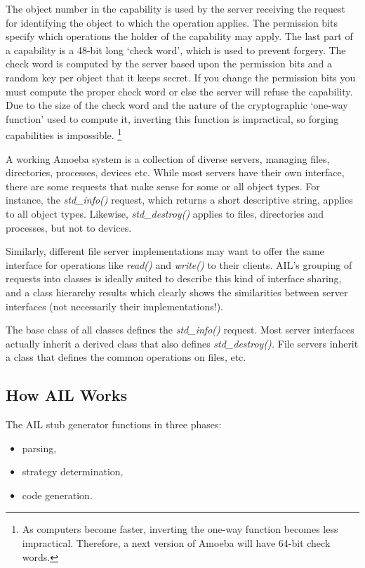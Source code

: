The object number in the capability is used by the server receiving
the request for identifying the object to which the operation applies.
The permission bits specify which operations the holder of the capability
may apply.  The last part of a capability is a 48-bit long `check
word', which is used to prevent forgery.  The check word is computed
by the server based upon the permission bits and a random key per object
that it keeps secret.  If you change the permission bits you must compute
the proper check word or else the server will refuse the capability.
Due to the size of the check word and the nature of the cryptographic
`one-way function' used to compute it, inverting this function is
impractical, so forging capabilities is impossible.%
\footnote{
As computers become faster, inverting the one-way function becomes
less impractical.
Therefore, a next version of Amoeba will have 64-bit check words.
}

A working Amoeba system is a collection of diverse servers, managing
files, directories, processes, devices etc.  While most servers have
their own interface, there are some requests that make sense for some
or all object types.  For instance, the {\em std\_info()} request,
which returns a short descriptive string, applies to all object types.
Likewise, {\em std\_destroy()} applies to files, directories and
processes, but not to devices.

Similarly, different file server implementations may want to offer the
same interface for operations like {\em read()} and {\em write()} to
their clients.  AIL's grouping of requests into classes is ideally
suited to describe this kind of interface sharing, and a class
hierarchy results which clearly shows the similarities between server
interfaces (not necessarily their implementations!).

The base class of all classes defines the {\em std\_info()} request.
Most server interfaces actually inherit a derived class that also
defines {\em std\_destroy().} File servers inherit a class that
defines the common operations on files, etc.

\subsection{How AIL Works}

The AIL stub generator functions in three phases:
\begin{itemize}
\item
parsing,
\item
strategy determination,
\item
code generation.
\end{itemize}

